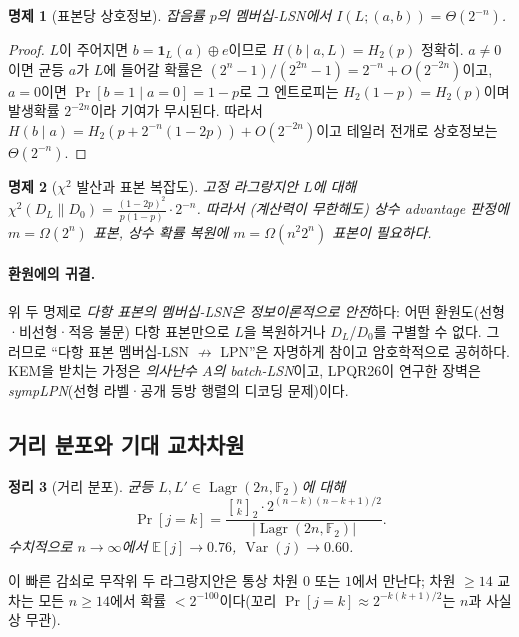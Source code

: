 \documentclass[11pt,a4paper]{article}
\theoremstyle{plain}
\newtheorem{theorem}{정리}[section]
\newtheorem{proposition}[theorem]{명제}
\theoremstyle{definition}
\newcommand{\F}{\mathbb{F}}
\newcommand{\E}{\mathbb{E}}
\DeclareMathOperator{\Lagr}{Lagr}
\begin{document}
\begin{proposition}[표본당 상호정보]
잡음률 $p$의 멤버십-LSN에서 $I(L;(a,b)) = \Theta(2^{-n})$.
\end{proposition}

\begin{proof}
$L$이 주어지면 $b = \mathbf{1}_L(a)\oplus e$이므로 $H(b\mid a,L) = H_2(p)$ 정확히. $a \neq 0$이면 균등 $a$가 $L$에 들어갈 확률은 $(2^n-1)/(2^{2n}-1) = 2^{-n} + O(2^{-2n})$이고, $a=0$이면 $\Pr[b=1\mid a=0]=1-p$로 그 엔트로피는 $H_2(1-p)=H_2(p)$이며 발생확률 $2^{-2n}$이라 기여가 무시된다. 따라서 $H(b\mid a) = H_2(p + 2^{-n}(1-2p)) + O(2^{-2n})$이고 테일러 전개로 상호정보는 $\Theta(2^{-n})$.
\end{proof}

\begin{proposition}[$\chi^2$ 발산과 표본 복잡도]
\label{prop:chi2-sample}
고정 라그랑지안 $L$에 대해 $\chi^2(D_L \| D_0) = \frac{(1-2p)^2}{p(1-p)} \cdot 2^{-n}$. 따라서 (계산력이 무한해도) 상수 advantage 판정에 $m = \Omega(2^n)$ 표본, 상수 확률 복원에 $m = \Omega(n^2 2^n)$ 표본이 필요하다.
\end{proposition}

\paragraph{환원에의 귀결.} 위 두 명제로 \emph{다항 표본의 멤버십-LSN은 정보이론적으로 안전}하다: 어떤 환원도(선형·비선형·적응 불문) 다항 표본만으로 $L$을 복원하거나 $D_L$/$D_0$를 구별할 수 없다. 그러므로 ``다항 표본 멤버십-LSN $\not\to$ LPN''은 자명하게 참이고 암호학적으로 공허하다. KEM을 받치는 가정은 \emph{의사난수 $A$의 batch-LSN}이고, LPQR26이 연구한 장벽은 \emph{sympLPN}(선형 라벨·공개 등방 행렬의 디코딩 문제)이다.

\subsection{거리 분포와 기대 교차차원}

\begin{theorem}[거리 분포]
균등 $L, L' \in \Lagr(2n,\F_2)$에 대해
\[
\Pr[j=k] = \frac{{n \brack k}_2 \cdot 2^{(n-k)(n-k+1)/2}}{|\Lagr(2n,\F_2)|}.
\]
수치적으로 $n \to \infty$에서 $\E[j] \to 0.76$, $\operatorname{Var}(j) \to 0.60$.
\end{theorem}

이 빠른 감쇠로 무작위 두 라그랑지안은 통상 차원 $0$ 또는 $1$에서 만난다; 차원 $\ge 14$ 교차는 모든 $n \ge 14$에서 확률 $< 2^{-100}$이다(꼬리 $\Pr[j=k]\approx 2^{-k(k+1)/2}$는 $n$과 사실상 무관).
\end{document}
